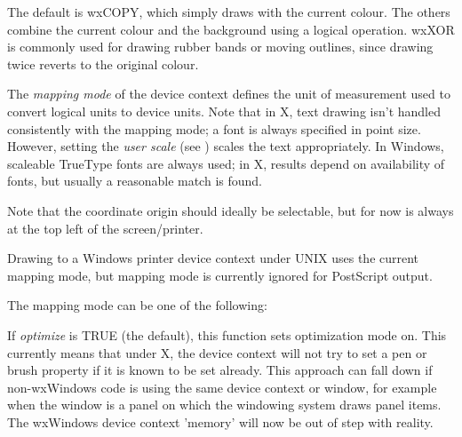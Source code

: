 The default is wxCOPY, which simply draws with the current colour.
The others combine the current colour and the background using a
logical operation.  wxXOR is commonly used for drawing rubber bands or
moving outlines, since drawing twice reverts to the original colour.

\label{wxdcsetmapmode}


The {\it mapping mode} of the device context defines the unit of
measurement used to convert logical units to device units. Note that
in X, text drawing isn't handled consistently with the mapping mode; a
font is always specified in point size. However, setting the {\it
user scale} (see ) scales the text appropriately. In
Windows, scaleable TrueType fonts are always used; in X, results depend
on availability of fonts, but usually a reasonable match is found.

Note that the coordinate origin should ideally be selectable, but for
now is always at the top left of the screen/printer.

Drawing to a Windows printer device context under UNIX
uses the current mapping mode, but mapping mode is currently ignored for
PostScript output.

The mapping mode can be one of the following:

\begin{twocollist}\itemsep=0pt
\end{twocollist}

\label{wxsetoptimization}


If {\it optimize} is TRUE (the default), this function sets optimization mode on.
This currently means that under X, the device context will not try to set a pen or brush
property if it is known to be set already. This approach can fall down
if non-wxWindows code is using the same device context or window, for example
when the window is a panel on which the windowing system draws panel items.
The wxWindows device context 'memory' will now be out of step with reality.

